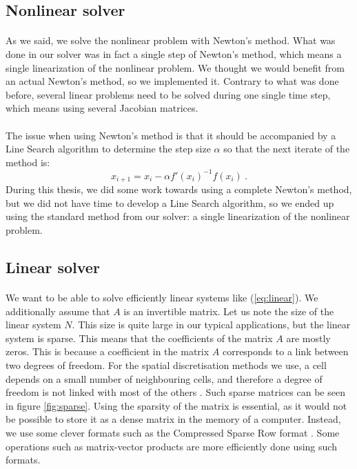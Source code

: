     \subsection{Nonlinear solver}

      \paragraph{}
      As we said, we solve the nonlinear problem with Newton's method.
      What was done in our solver was in fact a single step of Newton's method, which means a single linearization of the nonlinear problem.
      We thought we would benefit from an actual Newton's method, so we implemented it.
      Contrary to what was done before, several linear problems need to be solved during one single time step, which means using several Jacobian matrices.

      \paragraph{}
      The issue when using Newton's method is that it should be accompanied by a Line Search algorithm to determine the step size $\alpha$ so that the next iterate of the method is:
      \begin{equation}
        x_{i+1} = x_i - \alpha f'\left(x_i\right)^{-1} f\left(x_i\right) \ .
      \end{equation}
      During this thesis, we did some work towards using a complete Newton's method, but we did not have time to develop a Line Search algorithm, so we ended up using the standard method from our solver: a single linearization of the nonlinear problem.


    \subsection{Linear solver}

      \paragraph{}
      We want to be able to solve efficiently linear systems like (\ref{eq:linear}).
      We additionally assume that $A$ is an invertible matrix.
      Let us note the size of the linear system $N$.
      This size is quite large in our typical applications, but the linear system is sparse.
      This means that the coefficients of the matrix $A$ are mostly zeros.
      This is because a coefficient in the matrix $A$ corresponds to a link between two degrees of freedom.
      For the spatial discretisation methods we use, a cell depends on a small number of neighbouring cells, and therefore a degree of freedom is not linked with most of the others .
      Such sparse matrices can be seen in figure \ref{fig:sparse}.
      Using the sparsity of the matrix is essential, as it would not be possible to store it as a dense matrix in the memory of a computer.
      Instead, we use some clever formats such as the Compressed Sparse Row format \cite{Saad2003}.
      Some operations such as matrix-vector products are more efficiently done using such formats.

